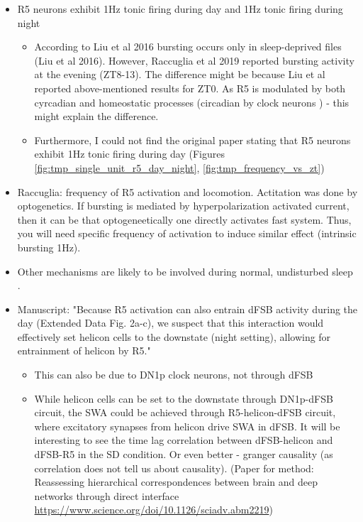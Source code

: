 \documentclass[../main.tex]{subfiles}
\begin{document}
\begin{itemize}
    \item R5 neurons exhibit 1Hz tonic firing during day and 1Hz tonic firing during night
    \begin{itemize}
        \item According to Liu et al 2016 bursting occurs only in sleep-deprived files (Liu et al 2016). However,
        Raccuglia et al 2019 reported bursting activity at the evening (ZT8-13). The difference might be because
        Liu et al reported above-mentioned results for ZT0. As R5 is modulated by both cyrcadian and homeostatic
        processes (circadian by clock neurons \cite{doppSinglecellTranscriptomicsReveals2024})
        - this might explain the difference.
        \item Furthermore, I could not find the original paper stating that R5 neurons
        exhibit 1Hz tonic firing during day (Figures \ref{fig:tmp_single_unit_r5_day_night}, \ref{fig:tmp_frequency_vs_zt})
    \end{itemize}

    \item Raccuglia: frequency of R5 activation and locomotion. Actitation was done by optogenetics. If bursting is
    mediated by hyperpolarization activated current, then it can be that optogeneetically one directly
    activates fast system. Thus, you will need specific frequency of activation to induce similar
    effect (intrinsic bursting 1Hz).

    \item Other mechanisms are likely to be involved during normal, undisturbed sleep \cite{liuSleepDriveEncoded2016}.
    
    \item Manuscript: "Because R5 activation can also entrain
    dFSB activity during the day (Extended Data Fig. 2a-c), we suspect that this interaction would
    effectively set helicon cells to the downstate (night setting), allowing for entrainment of
    helicon by R5."
    \begin{itemize}
        \item This can also be due to DN1p clock neurons, not through dFSB
        \item While helicon cells can be set to the downstate through DN1p-dFSB circuit,
        the SWA could be achieved through R5-helicon-dFSB circuit, where
        excitatory synapses from helicon drive SWA in dFSB. It will be interesting
        to see the time lag correlation between dFSB-helicon and dFSB-R5 in the SD condition.
        Or even better - granger causality (as correlation does not tell us about causality).
        (Paper for method: 
        Reassessing hierarchical correspondences between brain and deep networks through direct interface
        \url{https://www.science.org/doi/10.1126/sciadv.abm2219})
    \end{itemize}

\end{itemize}
\end{document}
